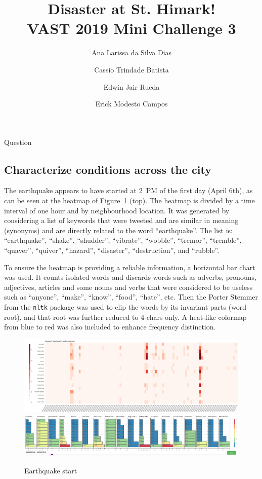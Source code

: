 \documentclass{article}
\author{Ana Larissa da Silva Dias \and Cassio Trindade Batista \and Edwin Jair Rueda \and Erick Modesto Campos}
\title{Disaster at St. Himark!\\VAST 2019 Mini Challenge 3}
\begin{document}
\maketitle

\begin{section}{Question}
\subsection{Characterize conditions across the city}
The earthquake appears to have started at 2~PM of the first day (April 6th), as
can be seen at the heatmap of Figure~\ref{fig:eq_start} (top). The heatmap is
divided by a time interval of one hour and by neighbourhood location. It was
generated by considering a list of keywords that were tweeted and are similar in 
meaning (synonyms) and are directly related to the word ``earthquake''. The list 
is: ``earthquake'', ``shake'', ``shudder'', ``vibrate'', ``wobble'', ``tremor'',
``tremble'', ``quaver'', ``quiver'', ``hazard'', ``disaster'', ``destruction'',
and ``rubble''.

To ensure the heatmap is providing a reliable information, a horizontal bar
chart was used. It counts isolated words and discards words such as adverbs,
pronouns, adjectives, articles and some nouns and verbs that were considered to
be useless such as ``anyone'', ``make'', ``know'', ``food'', ``hate'', etc. Then
the Porter Stemmer from the \texttt{nltk} package was used to clip the words by
its invariant parts (word root), and that root was further reduced to 4-chars
only. A heat-like colormap from blue to red was also included to enhance 
frequency distinction. 

\begin{figure}[!h]
    \centering
    \includegraphics[width=1.00\textwidth]{figs/earthquake_start_heat.png}\\[12pt]
    \includegraphics[width=1.00\textwidth]{figs/earthquake_start_hbar.png}
    \caption{Earthquake start}
    \label{fig:eq_start}
\end{figure}


\end{section}
\end{document}
